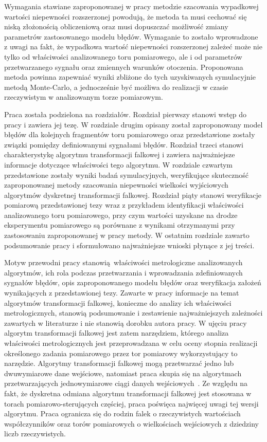 Wymagania stawiane zaproponowanej w pracy metodzie szacowania wypadkowej wartości niepewności rozszerzonej powodują, że metoda ta musi cechować się niską złożonością obliczeniową oraz musi dopuszczać możliwość zmiany parametrów zastosowanego modelu błędów. Wymaganie to zostało wprowadzone z uwagi na fakt, że wypadkowa wartość niepewności rozszerzonej zależeć może nie tylko od właściwości analizowanego toru pomiarowego, ale i od parametrów przetwarzanego sygnału oraz zmiennych warunków otoczenia. Proponowana metoda powinna zapewniać wyniki zbliżone do tych uzyskiwanych symulacyjnie metodą Monte-Carlo, a jednocześnie być możliwa do realizacji w czasie rzeczywistym w analizowanym torze pomiarowym.

Praca została podzielona na  rozdziałów. Rozdział pierwszy stanowi wstęp do pracy i zawiera jej tezę. W rozdziale drugim opisany został zaproponowany model błędów dla kolejnych fragmentów toru pomiarowego oraz przedstawione zostały związki pomiędzy definiowanymi sygnałami błędów. Rozdział trzeci stanowi charakterystykę algorytmu transformacji falkowej i zawiera najważniejsze informacje dotyczące właściwości tego algorytmu. W rozdziale czwartym przedstawione zostały wyniki badań symulacyjnych, weryfikujące skuteczność zaproponowanej metody szacowania niepewności wielkości wyjściowych algorytmów dyskretnej transformacji falkowej. Rozdział piąty stanowi weryfikacje pomiarową przedstawionej tezy wraz z przykładem identyfikacji właściwości analizowanego toru pomiarowego, przy czym wartości uzyskane na drodze eksperymentu pomiarowego są porównane z wynikami otrzymanymi przy zastosowaniu zaproponowanej w pracy metody. W ostatnim rozdziale zawarto podsumowanie pracy i sformułowano najważniejsze wnioski płynące z jej treści.

Motyw przewodni pracy stanowią właściwości metrologiczne analizowanych algorytmów, ich rola podczas przetwarzania i wprowadzania zdefiniowanych sygnałów błędów, opis zaproponowanego modelu błędów oraz weryfikacja założeń wynikających z przedstawionej tezy. Zawarte w pracy informacje na temat algorytmów transformacji falkowej, konieczne do analizy ich właściwości metrologicznych, stanowią podsumowanie i zestawienie najważniejszych zależności zawartych w literaturze i nie stanowią dorobku autora pracy. W ujęciu pracy algorytm transformacji falkowej jest zatem narzędziem, którego analiza właściwości metrologicznych jest przeprowadzana w celu oceny stopnia realizacji określonego zadania pomiarowego przez tor pomiarowy wykorzystujący to narzędzie. Algorytmy transformacji falkowej mogą przetwarzać jedno lub dwuwymiarowe dane wejściowe, natomiast praca skupia się na algorytmach przetwarzających jednowymiarowe ciągi danych wejściowych~\cite{wallen_handbook}. Ze względu na fakt, że dyskretna odmiana algorytmu transformacji falkowej jest stosowana w torach pomiarowo-sterujących częściej, praca poświęca najwięcej uwagi tej wersji algorytmu. Praca ogranicza się do rodzin falek o rzeczywistych wartościach współczynników oraz torów pomiarowych o wielkościach wejściowych z dziedziny liczb rzeczywistych.

